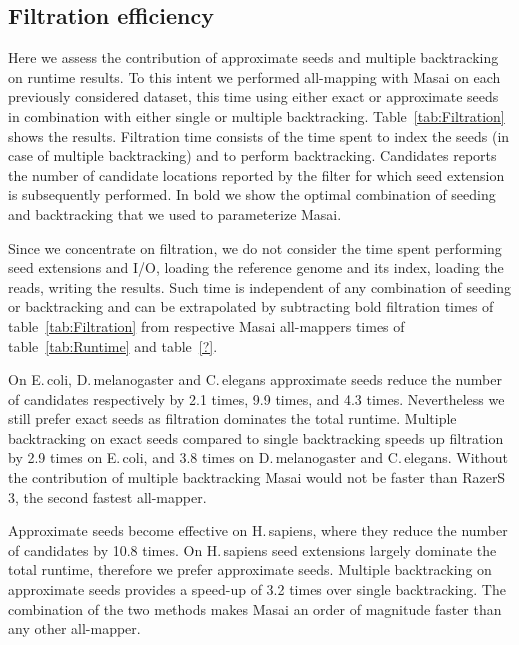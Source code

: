 \subsection{Filtration efficiency}

Here we assess the contribution of approximate seeds and multiple backtracking on runtime results.
To this intent we performed all-mapping with Masai on each previously considered dataset, this time using either exact or approximate seeds in combination with either single or multiple backtracking.
Table~\ref{tab:Filtration} shows the results.
Filtration time consists of the time spent to index the seeds (in case of multiple backtracking) and to perform backtracking.
Candidates reports the number of candidate locations reported by the filter for which seed extension is subsequently performed.
In bold we show the optimal combination of seeding and backtracking that we used to parameterize Masai.

Since we concentrate on filtration, we do not consider the time spent performing seed extensions and I/O, \ie loading the reference genome and its index, loading the reads, writing the results.
Such time is independent of any combination of seeding or backtracking and can be extrapolated by subtracting bold filtration times of table~\ref{tab:Filtration} from respective Masai all-mappers times of table~\ref{tab:Runtime} and table~\ref{?}.

On E.\,coli, D.\,melanogaster and C.\,elegans approximate seeds reduce the number of candidates respectively by 2.1 times, 9.9 times, and 4.3 times.
Nevertheless we still prefer exact seeds as filtration dominates the total runtime.
Multiple backtracking on exact seeds compared to single backtracking speeds up filtration by 2.9 times on E.\,coli, and 3.8 times on D.\,melanogaster and C.\,elegans.
Without the contribution of multiple backtracking Masai would not be faster than RazerS\,3, the second fastest all-mapper.

Approximate seeds become effective on H.\,sapiens, where they reduce the number of candidates by 10.8 times. 
On H.\,sapiens seed extensions largely dominate the total runtime, therefore we prefer approximate seeds.
Multiple backtracking on approximate seeds provides a speed-up of 3.2 times over single backtracking.
The combination of the two methods makes Masai an order of magnitude faster than any other all-mapper.

